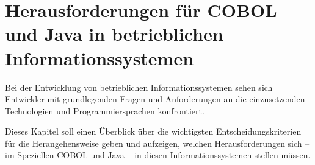 \chapter{Herausforderungen für COBOL und Java in betrieblichen Informationssystemen}
Bei der Entwicklung von betrieblichen Informationssystemen sehen sich Entwickler mit grundlegenden Fragen und Anforderungen an die einzusetzenden Technologien und Programmiersprachen konfrontiert.

Dieses Kapitel soll einen Überblick über die wichtigsten Entscheidungskriterien für die Herangehensweise geben und aufzeigen, welchen Herausforderungen sich -- im Speziellen COBOL und Java -- in diesen Informationssystemen stellen müssen.

\label{ch:herausforderungen}
    
    
    
    
    